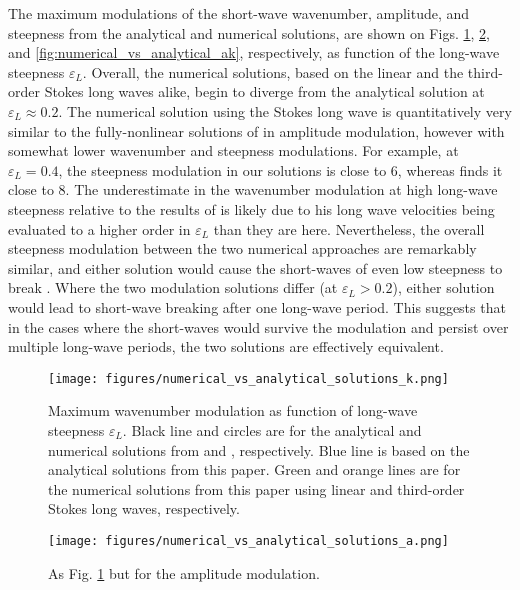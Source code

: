 \documentclass[lineno]{jfm}
\begin{document}
The maximum modulations of the short-wave wavenumber, amplitude, and steepness
from the analytical and numerical solutions, are shown on Figs.
\ref{fig:numerical_vs_analytical_k},
\ref{fig:numerical_vs_analytical_a}, and
\ref{fig:numerical_vs_analytical_ak}, respectively, as function of the long-wave
steepness $\varepsilon_L$.
Overall, the numerical solutions, based on the linear and the third-order Stokes
long waves alike, begin to diverge from the analytical solution at
$\varepsilon_L \approx 0.2$.
The numerical solution using the Stokes long wave is quantitatively very similar
to the fully-nonlinear solutions of \citet{longuet1987propagation} in amplitude
modulation, however with somewhat lower wavenumber and steepness modulations.
For example, at $\varepsilon_L = 0.4$, the steepness modulation in our solutions
is close to 6, whereas \citet{longuet1987propagation} finds it close to 8.
The underestimate in the wavenumber modulation at high long-wave steepness
relative to the results of \citet{longuet1987propagation}
is likely due to his long wave velocities being evaluated to a higher order in
$\varepsilon_L$ than they are here.
Nevertheless, the overall steepness modulation between the two numerical
approaches are remarkably similar, and either solution would cause the
short-waves of even low steepness to break \citep{banner1993wave}.
Where the two modulation solutions differ (at $\varepsilon_L > 0.2$),
either solution would lead to short-wave breaking after one long-wave period.
This suggests that in the cases where the short-waves would survive the
modulation and persist over multiple long-wave periods, the two solutions are
effectively equivalent.

\begin{figure}
\centering
\texttt{[image: figures/numerical\_vs\_analytical\_solutions\_k.png]}
\caption{
  Maximum wavenumber modulation as function of long-wave steepness $\varepsilon_L$.
  Black line and circles are for the analytical and numerical solutions from
  \citet{longuet1960changes} and \citet{longuet1987propagation}, respectively.
  Blue line is based on the analytical solutions from this paper.
  Green and orange lines are for the numerical solutions from this paper
  using linear and third-order Stokes long waves, respectively.
}
\label{fig:numerical_vs_analytical_k}
\end{figure}

\begin{figure}
\centering
\texttt{[image: figures/numerical\_vs\_analytical\_solutions\_a.png]}
\caption{
  As Fig. \ref{fig:numerical_vs_analytical_k} but for the amplitude modulation.
}
\label{fig:numerical_vs_analytical_a}
\end{figure}
\end{document}
